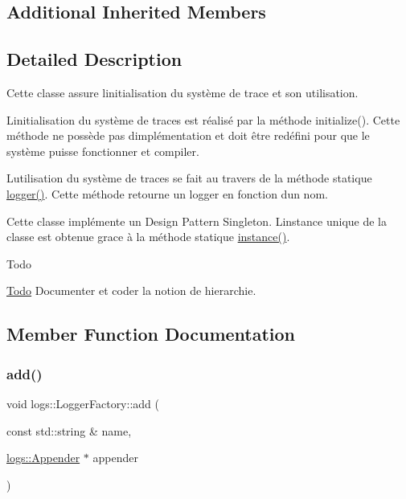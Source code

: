 \subsection*{Additional Inherited Members}


\subsection{Detailed Description}
Cette classe assure l\textquotesingle{}initialisation du système de trace et son utilisation. 

L\textquotesingle{}initialisation du système de traces est réalisé par la méthode initialize(). Cette méthode ne possède pas d\textquotesingle{}implémentation et doit être redéfini pour que le système puisse fonctionner et compiler.

L\textquotesingle{}utilisation du système de traces se fait au travers de la méthode statique \hyperlink{classlogs_1_1LoggerFactory_a82585b5de73e471e06cafdccc3b3721e}{logger()}. Cette méthode retourne un logger en fonction d\textquotesingle{}un nom.

Cette classe implémente un Design Pattern Singleton. L\textquotesingle{}instance unique de la classe est obtenue grace à la méthode statique \hyperlink{classlogs_1_1LoggerFactory_a90478b91d7af2ef8841ded21e3521f69}{instance()}.

\begin{DoxyRefDesc}{Todo}
\item[\hyperlink{todo__todo000002}{Todo}]Documenter et coder la notion de hierarchie. \end{DoxyRefDesc}


\subsection{Member Function Documentation}
\mbox{\label{classlogs_1_1LoggerFactory_ac89f19c0ffd71aa8cdc1c2d44c03809e}} 
\subsubsection{\texorpdfstring{add()}{add()}\hspace{0.1cm}{\footnotesize\ttfamily [1/3]}}
{\footnotesize\ttfamily void logs\+::\+Logger\+Factory\+::add (\begin{DoxyParamCaption}\item[{const std\+::string \&}]{name,  }\item[{\hyperlink{classlogs_1_1Appender}{logs\+::\+Appender} $\ast$}]{appender }\end{DoxyParamCaption})\hspace{0.3cm}{\ttfamily [protected]}}



